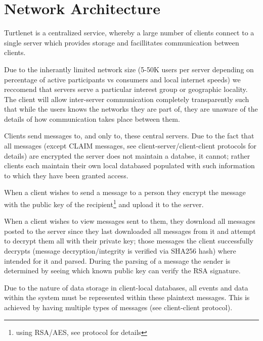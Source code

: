 \section{Network Architecture}
Turtlenet is a centralized service, whereby a large number of clients connect to
a single server which provides storage and facillitates communication between
clients.

Due to the inherantly limited network size (5-50K users per server depending on
percentage of active participants vs consumers and local internet speeds) we
reccomend that servers serve a particular interest group or geographic locality.
The client will allow inter-server communication completely transparently such
that while the users knows the networks they are part of, they are unaware of
the details of how communication takes place between them.

Clients send messages to, and only to, these central servers. Due to the fact
that all messages (except CLAIM messages, see client-server/client-client
protocols for details) are encrypted the server does not maintain a databse, it
cannot; rather clients each maintain their own local databased populated with
such information to which they have been granted access.

When a client wishes to send a message to a person they encrypt the message with
the public key of the recipient\footnote{using RSA/AES, see protocol for
details} and upload it to the server.

When a client wishes to view messages sent to them, they download all messages
posted to the server since they last downloaded all messages from it and attempt
to decrypt them all with their private key; those messages the client
successfully decrypts (message decryption/integrity is verified via SHA256 hash)
where intended for it and parsed. During the parsing of a message the sender is
determined by seeing which known public key can verify the RSA signature.

Due to the nature of data storage in client-local databases, all events and data
within the system must be represented within these plaintext messages. This is
achieved by having multiple types of messages (see client-client protocol).

